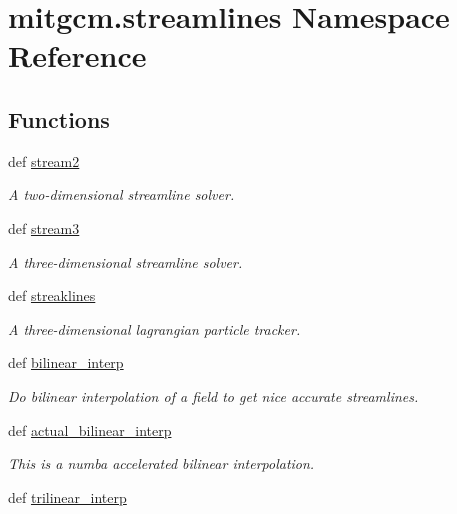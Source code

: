 \hypertarget{namespacemitgcm_1_1streamlines}{\section{mitgcm.\+streamlines Namespace Reference}
\label{namespacemitgcm_1_1streamlines}
}
\subsection*{Functions}
\begin{DoxyCompactItemize}
\item 
def \hyperlink{namespacemitgcm_1_1streamlines_ac4d6c763bdac75600b3778f4e0ea3a31}{stream2}
\begin{DoxyCompactList}\small\item\em A two-\/dimensional streamline solver. \end{DoxyCompactList}\item 
def \hyperlink{namespacemitgcm_1_1streamlines_a38690a408e43bb899018203363da090d}{stream3}
\begin{DoxyCompactList}\small\item\em A three-\/dimensional streamline solver. \end{DoxyCompactList}\item 
def \hyperlink{namespacemitgcm_1_1streamlines_a493dab136e4b63582d7f6b77e7a9c644}{streaklines}
\begin{DoxyCompactList}\small\item\em A three-\/dimensional lagrangian particle tracker. \end{DoxyCompactList}\item 
def \hyperlink{namespacemitgcm_1_1streamlines_a5a11f20c3c4d530adaf0861633f62ce3}{bilinear\+\_\+interp}
\begin{DoxyCompactList}\small\item\em Do bilinear interpolation of a field to get nice accurate streamlines. \end{DoxyCompactList}\item 
def \hyperlink{namespacemitgcm_1_1streamlines_ad0a40f9a0e3135fab213b52fb83bf038}{actual\+\_\+bilinear\+\_\+interp}
\begin{DoxyCompactList}\small\item\em This is a numba accelerated bilinear interpolation. \end{DoxyCompactList}\item 
def \hyperlink{namespacemitgcm_1_1streamlines_afa4d0f154a2e8ad8cc4154dc7ff861b1}{trilinear\+\_\+interp}

\end{DoxyCompactItemize}

